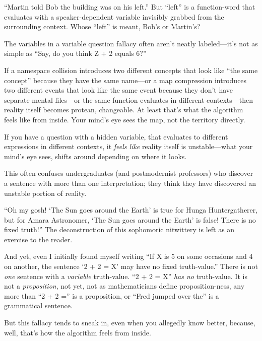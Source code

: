 {
 ``Martin told Bob the building was on his
left.'' But
``left'' is a function-word that
evaluates with a speaker-dependent variable invisibly grabbed from the
surrounding context. Whose ``left''
is meant, Bob's or Martin's?}

{
 The variables in a variable question fallacy often
aren't neatly labeled---it's not as
simple as ``Say, do you think Z + 2 equals
6?''}

{
 If a namespace collision introduces two different concepts that
look like ``the same concept''
because they have the same name---or a map compression introduces two
different events that look like the same event because they
don't have separate mental files---or the same function
evaluates in different contexts---then reality itself becomes protean,
changeable. At least that's what the algorithm feels
like from inside. Your mind's eye sees the map, not the
territory directly.}

{
 If you have a question with a hidden variable, that evaluates to
different expressions in different contexts, it \textit{feels like}
reality itself is unstable---what your mind's eye sees,
shifts around depending on where it looks.}

{
 This often confuses undergraduates (and postmodernist professors)
who discover a sentence with more than one interpretation; they think
they have discovered an unstable portion of reality.}

{
 ``Oh my gosh! `The Sun goes around
the Earth' is true for Hunga Huntergatherer, but for
Amara Astronomer, `The Sun goes around the
Earth' is false! There is no fixed
truth!'' The deconstruction of this sophomoric
nitwittery is left as an exercise to the reader.}

{
 And yet, even I initially found myself writing
``If X is 5 on some occasions and 4 on another, the
sentence `2 + 2 = X' may have no fixed
truth-value.'' There is not \textit{one} sentence
with a \textit{variable} truth-value. ``2 + 2 =
X'' \textit{has no} truth-value. It is not a
\textit{proposition}, not yet, not as mathematicians define
proposition-ness, any more than ``2 + 2
='' is a proposition, or ``Fred
jumped over the'' is a grammatical sentence.}

{
 But this fallacy tends to sneak in, even when you allegedly know
better, because, well, that's how the algorithm feels
from inside.}

\myendsectiontext


